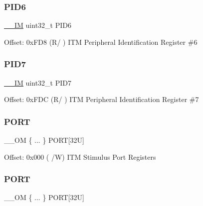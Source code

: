 \subsubsection{\texorpdfstring{P\+I\+D6}{PID6}}
{\footnotesize\ttfamily \mbox{\hyperlink{core__cm4_8h_a4cc1649793116d7c2d8afce7a4ffce43}{\+\_\+\+\_\+\+IM}} uint32\+\_\+t P\+I\+D6}

Offset\+: 0x\+F\+D8 (R/ ) I\+TM Peripheral Identification Register \#6 \mbox{\label{struct_i_t_m___type_af8aa73aeaf37bdf7dfd9f6c437ff2d2f}} 
\subsubsection{\texorpdfstring{P\+I\+D7}{PID7}}
{\footnotesize\ttfamily \mbox{\hyperlink{core__cm4_8h_a4cc1649793116d7c2d8afce7a4ffce43}{\+\_\+\+\_\+\+IM}} uint32\+\_\+t P\+I\+D7}

Offset\+: 0x\+F\+DC (R/ ) I\+TM Peripheral Identification Register \#7 \mbox{\label{struct_i_t_m___type_a59dfe463f963fae339f3cbde7cb96821}} 
\subsubsection{\texorpdfstring{P\+O\+RT}{PORT}\hspace{0.1cm}{\footnotesize\ttfamily [1/2]}}
{\footnotesize\ttfamily \+\_\+\+\_\+\+OM \{ ... \}    P\+O\+RT\mbox{[}32\+U\mbox{]}}

Offset\+: 0x000 ( /W) I\+TM Stimulus Port Registers \mbox{\label{struct_i_t_m___type_afee369623a7e583097a711ed6b435730}} 
\subsubsection{\texorpdfstring{P\+O\+RT}{PORT}\hspace{0.1cm}{\footnotesize\ttfamily [2/2]}}
{\footnotesize\ttfamily \+\_\+\+\_\+\+OM \{ ... \}    P\+O\+RT\mbox{[}32\+U\mbox{]}}

